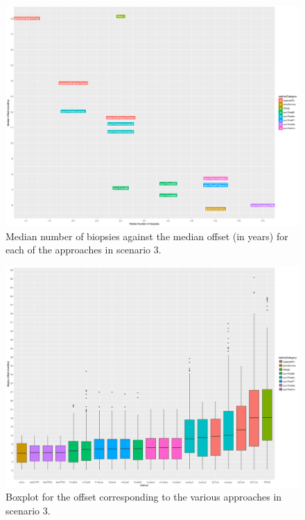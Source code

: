 \begin{figure}[H]
\centering
\captionsetup{justification=centering}
\includegraphics[width=\textwidth]{sim_study_res_sc_8pt5_sh_3/median_offsetvsnb.png}
\caption{\label{fig : sc_8pt5_sh_3_median_offsetvsnb}Median number of biopsies against the median offset (in years) for each of the approaches in scenario 3.}
\end{figure}

\begin{figure}[H]
\centering
\captionsetup{justification=centering}
\includegraphics[width=\textwidth]{sim_study_res_sc_8pt5_sh_3/offset_boxplot.png}
\caption{\label{fig : sc_8pt5_sh_3_offset_boxplot} Boxplot for the offset corresponding to the various approaches in scenario 3.}
\end{figure}

